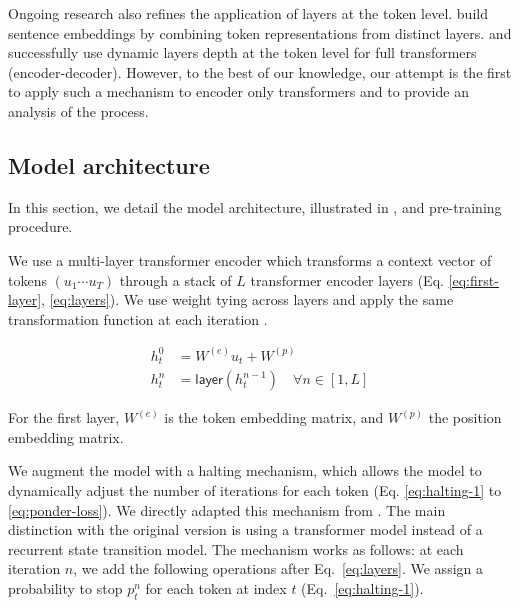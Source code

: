 Ongoing research also refines the application of layers at the token level. \textcite{wang_20} build sentence embeddings by combining token representations from distinct layers. \textcite{elbayad_20} and \textcite{dehghani_19} successfully use dynamic layers depth at the token level for full transformers (encoder-decoder). However, to the best of our knowledge, our attempt is the first to apply such a mechanism to encoder only transformers and to provide an analysis of the process. 


\subsection{Model architecture}

In this section, we detail the model architecture, illustrated in , and pre-training procedure.

We use a multi-layer transformer encoder \parencite{devlin_19} which transforms a context vector of tokens $(u_1 \cdots u_{T})$ through a stack of $L$ transformer encoder layers (Eq. \ref{eq:first-layer}, \ref{eq:layers}). 
We use weight tying across layers and apply the same transformation function at each iteration \parencite{lan_20}.

\begin{align}
    h^0_t &= W^{(e)}u_t + W^{(p)} \label{eq:first-layer}\\
    h^n_t &= \mathsf{layer}(h^{n-1}_t) \quad \forall n \in [1, L] \label{eq:layers}
\end{align}

For the first layer, $W^{(e)}$ is the token embedding matrix, and $W^{(p)}$ the position embedding matrix.

We augment the model with a halting mechanism, which allows the model to dynamically adjust the number of iterations for each token (Eq. \ref{eq:halting-1} to \ref{eq:ponder-loss}). We directly adapted this mechanism from \textcite{graves_16}. The main distinction with the original version is using a transformer model instead of a recurrent state transition model. The mechanism works as follows: at each iteration $n$, we add the following operations after Eq.~\ref{eq:layers}. We assign a probability to stop $p^n_t$ for each token at index $t$ (Eq.~\ref{eq:halting-1}). 

